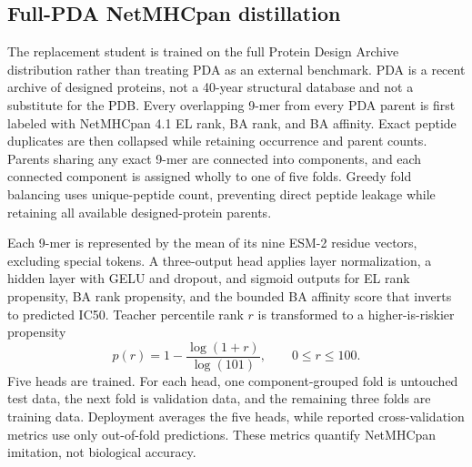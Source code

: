 \documentclass{article}
\begin{document}
\subsection{Full-PDA NetMHCpan distillation}
The replacement student is trained on the full Protein Design Archive distribution rather than treating PDA as an external benchmark. PDA is a recent archive of designed proteins, not a 40-year structural database and not a substitute for the PDB. Every overlapping 9-mer from every PDA parent is first labeled with NetMHCpan 4.1 EL rank, BA rank, and BA affinity. Exact peptide duplicates are then collapsed while retaining occurrence and parent counts. Parents sharing any exact 9-mer are connected into components, and each connected component is assigned wholly to one of five folds. Greedy fold balancing uses unique-peptide count, preventing direct peptide leakage while retaining all available designed-protein parents.

Each 9-mer is represented by the mean of its nine ESM-2 residue vectors, excluding special tokens. A three-output head applies layer normalization, a hidden layer with GELU and dropout, and sigmoid outputs for EL rank propensity, BA rank propensity, and the bounded BA affinity score that inverts to predicted IC50. Teacher percentile rank $r$ is transformed to a higher-is-riskier propensity
\begin{equation}
  p(r)=1-\frac{\log(1+r)}{\log(101)}, \qquad 0\leq r\leq100.
\end{equation}
Five heads are trained. For each head, one component-grouped fold is untouched test data, the next fold is validation data, and the remaining three folds are training data. Deployment averages the five heads, while reported cross-validation metrics use only out-of-fold predictions. These metrics quantify NetMHCpan imitation, not biological accuracy.
\end{document}
